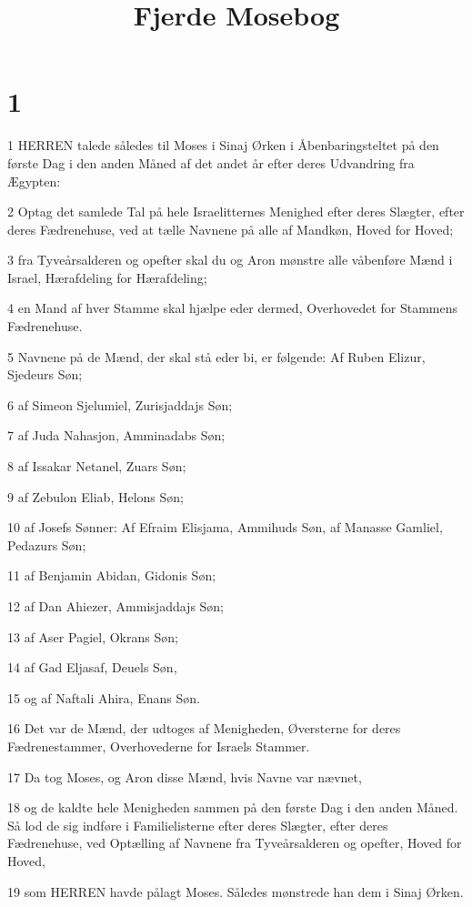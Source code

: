 

\title{Fjerde Mosebog}


\chapter{1}

\par 1 HERREN talede således til Moses i Sinaj Ørken i Åbenbaringsteltet på den første Dag i den anden Måned af det andet år efter deres Udvandring fra Ægypten:
\par 2 Optag det samlede Tal på hele Israelitternes Menighed efter deres Slægter, efter deres Fædrenehuse, ved at tælle Navnene på alle af Mandkøn, Hoved for Hoved;
\par 3 fra Tyveårsalderen og opefter skal du og Aron mønstre alle våbenføre Mænd i Israel, Hærafdeling for Hærafdeling;
\par 4 en Mand af hver Stamme skal hjælpe eder dermed, Overhovedet for Stammens Fædrenehuse.
\par 5 Navnene på de Mænd, der skal stå eder bi, er følgende: Af Ruben Elizur, Sjedeurs Søn;
\par 6 af Simeon Sjelumiel, Zurisjaddajs Søn;
\par 7 af Juda Nahasjon, Amminadabs Søn;
\par 8 af Issakar Netanel, Zuars Søn;
\par 9 af Zebulon Eliab, Helons Søn;
\par 10 af Josefs Sønner: Af Efraim Elisjama, Ammihuds Søn, af Manasse Gamliel, Pedazurs Søn;
\par 11 af Benjamin Abidan, Gidonis Søn;
\par 12 af Dan Ahiezer, Ammisjaddajs Søn;
\par 13 af Aser Pagiel, Okrans Søn;
\par 14 af Gad Eljasaf, Deuels Søn,
\par 15 og af Naftali Ahira, Enans Søn.
\par 16 Det var de Mænd, der udtoges af Menigheden, Øversterne for deres Fædrenestammer, Overhovederne for Israels Stammer.
\par 17 Da tog Moses, og Aron disse Mænd, hvis Navne var nævnet,
\par 18 og de kaldte hele Menigheden sammen på den første Dag i den anden Måned. Så lod de sig indføre i Familielisterne efter deres Slægter, efter deres Fædrenehuse, ved Optælling af Navnene fra Tyveårsalderen og opefter, Hoved for Hoved,
\par 19 som HERREN havde pålagt Moses. Således mønstrede han dem i Sinaj Ørken.
